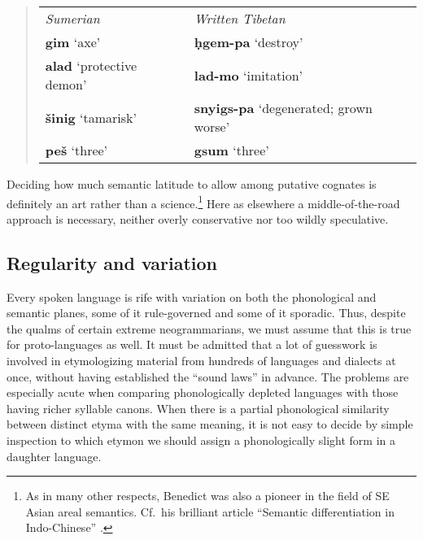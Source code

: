 \begin{quote}
\begin{tabular}{l l}
		\textit{Sumerian}		&		\textit{Written Tibetan}\\
		\textbf{gim} ‘axe’		&		\textbf{ḥgem-pa} ‘destroy’\\
		\textbf{alad} ‘protective demon’	&	\textbf{lad-mo} ‘imitation’\\
		\textbf{šinig} ‘tamarisk’	&		\textbf{snyigs-pa} ‘degenerated; grown worse’\\
		\textbf{peš} ‘three’	&		\textbf{gsum} ‘three’\\
\end{tabular}
\end{quote}

Deciding how much semantic latitude to allow among putative cognates is
definitely an art rather than a science.\footnote{As in many other respects, Benedict was also a pioneer in the field of SE Asian areal semantics. Cf.\ his brilliant article “Semantic differentiation in Indo-Chinese” \citeyearpar{PKB-SDIC}.} Here as elsewhere a middle-of-the-road
approach is necessary, neither overly conservative nor too wildly speculative.



\subsection{Regularity and variation}

Every spoken language is rife with variation on both the phonological and semantic planes,
some of it rule-governed and some of it sporadic. Thus, despite the qualms of certain
extreme neogrammarians, we must assume that this is true for proto-languages as well. It
must be admitted that a lot of guesswork is involved in etymologizing
material from hundreds of languages and dialects at once, without having
established the “sound laws” in advance. The problems are especially acute when
comparing phonologically depleted languages with those having richer syllable
canons. When there is a partial phonological similarity between distinct etyma
with the same meaning, it is not easy to decide by simple inspection to which
etymon we should assign a phonologically slight form in a daughter language.


